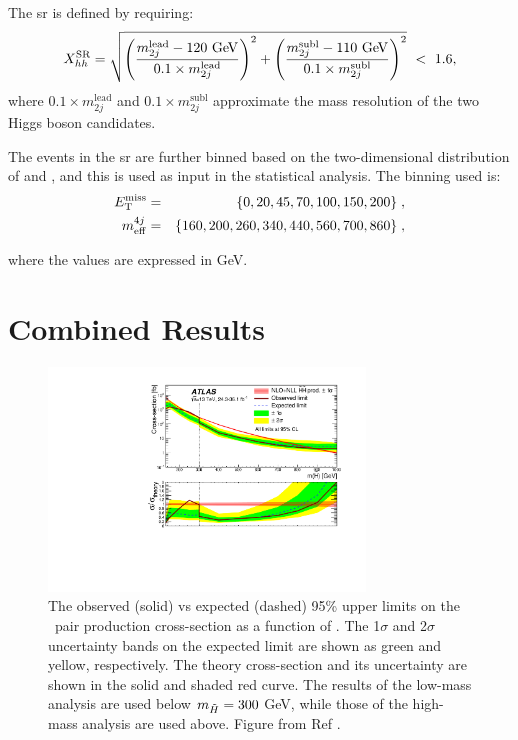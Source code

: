 The \gls{sr} is defined by requiring: 
\begin{equation}
X_{hh}^\textrm{SR} = \sqrt{ \left( \frac{m_{2j}^\textrm{lead} - 120\ \text{Ge\kern -0.1em V}}{0.1\times m_{2j}^\textrm{lead}} \right)^2 + \left( \frac{m_{2j}^\textrm{subl} - 110\ \text{Ge\kern -0.1em V}}{0.1\times m_{2j}^\textrm{subl}} \right)^2} \ <\ 1.6,
\end{equation}
\noindent where $0.1 \times m_{2j}^\textrm{lead}$ and $0.1 \times m_{2j}^\textrm{subl}$ approximate the mass resolution of the two Higgs 
boson candidates. 

The events in the \gls{sr} are further binned based on the two-dimensional distribution of \met and \meff, 
and this is used as input in the statistical analysis. The binning used is:
\begin{eqnarray*} 
E_{\rm T}^{\mathrm{miss}} &=& \{0, 20, 45, 70, 100, 150, 200\} \;, \\
m_{\mathrm{eff}}^{4j} &=&\{160, 200, 260, 340, 440, 560, 700, 860\} \;,
\end{eqnarray*}

\noindent where the values are expressed in GeV.

\section{Combined Results}

\begin{figure}[htbp]
	\centering
\includegraphics[width=0.75\textwidth]{figures/ewk_prod/interpretation/GGMupperLimit_unblinded_jump}
	\caption{The observed (solid) vs expected (dashed) 95\% upper limits on the \hino\ pair production cross-section as a function of \mhino.  The 1$\sigma$ and 2$\sigma$ uncertainty bands on the expected limit are shown as green and yellow, respectively. The theory cross-section and its uncertainty are shown in the solid and shaded red curve.
   The results of the low-mass analysis are used below $m_{\tilde{H}} = 300$ GeV, while those of the high-mass analysis are used above. 
   Figure from Ref \cite{Aaboud:2018htj}. } 
	\label{fig:exclusion}
\end{figure}


